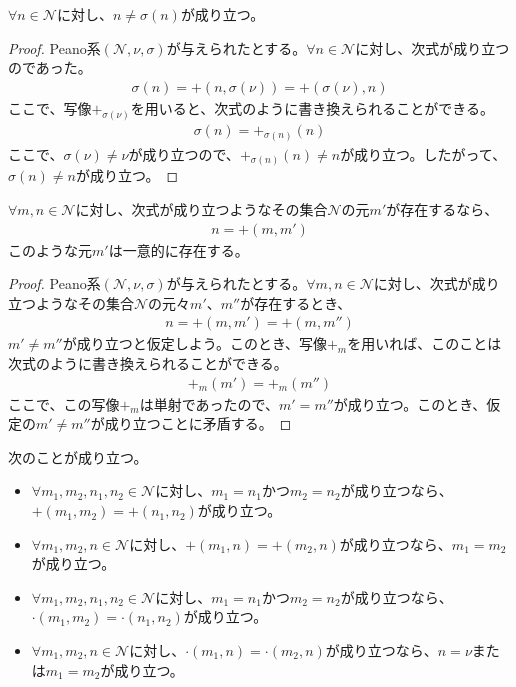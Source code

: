 \documentclass[dvipdfmx]{jsarticle}
\begin{document}
\begin{thm}\label{1.2.4.16}
$\forall n \in \mathcal{N}$に対し、$n \neq \sigma(n)$が成り立つ。
\end{thm}
\begin{proof}
Peano系$\left( \mathcal{N,}\nu,\sigma \right)$が与えられたとする。$\forall n \in \mathcal{N}$に対し、次式が成り立つのであった。
\begin{align*}
\sigma(n) = + \left( n,\sigma(\nu) \right) = + \left( \sigma(\nu),n \right)
\end{align*}
ここで、写像$+_{\sigma(\nu)}$を用いると、次式のように書き換えられることができる。
\begin{align*}
\sigma(n) = +_{\sigma(n)}(n)
\end{align*}
ここで、$\sigma(\nu) \neq \nu$が成り立つので、$+_{\sigma(n)}(n) \neq n$が成り立つ。したがって、$\sigma(n) \neq n$が成り立つ。
\end{proof}
\begin{thm}\label{1.2.4.17}
$\forall m,n \in \mathcal{N}$に対し、次式が成り立つようなその集合$\mathcal{N}$の元$m'$が存在するなら、
\begin{align*}
n = + \left( m,m' \right)
\end{align*}
このような元$m'$は一意的に存在する。
\end{thm}
\begin{proof}
Peano系$\left( \mathcal{N,}\nu,\sigma \right)$が与えられたとする。$\forall m,n \in \mathcal{N}$に対し、次式が成り立つようなその集合$\mathcal{N}$の元々$m'$、$m''$が存在するとき、
\begin{align*}
n = + \left( m,m' \right) = + \left( m,m'' \right)
\end{align*}
$m' \neq m''$が成り立つと仮定しよう。このとき、写像$+_{m}$を用いれば、このことは次式のように書き換えられることができる。
\begin{align*}
+_{m}\left( m' \right) = +_{m}\left( m'' \right)
\end{align*}
ここで、この写像$+_{m}$は単射であったので、$m' = m''$が成り立つ。このとき、仮定の$m' \neq m''$が成り立つことに矛盾する。
\end{proof}
\begin{thm}\label{1.2.4.18}
次のことが成り立つ。
\begin{itemize}
\item
  $\forall m_{1},m_{2},n_{1},n_{2}\in \mathcal{N}$に対し、$m_{1} = n_{1}$かつ$m_{2} = n_{2}$が成り立つなら、$+ \left( m_{1},m_{2} \right) = + \left( n_{1},n_{2} \right)$が成り立つ。
\item
  $\forall m_{1},m_{2},n \in \mathcal{N}$に対し、$+ \left( m_{1},n \right) = + \left( m_{2},n \right)$が成り立つなら、$m_{1} = m_{2}$が成り立つ。
\item
  $\forall m_{1},m_{2},n_{1},n_{2}\in \mathcal{N}$に対し、$m_{1} = n_{1}$かつ$m_{2} = n_{2}$が成り立つなら、$\cdot \left( m_{1},m_{2} \right) = \cdot \left( n_{1},n_{2} \right)$が成り立つ。
\item
  $\forall m_{1},m_{2},n \in \mathcal{N}$に対し、$\cdot \left( m_{1},n \right) = \cdot \left( m_{2},n \right)$が成り立つなら、$n = \nu$または$m_{1} = m_{2}$が成り立つ。
\end{itemize}
\end{thm}
\end{document}
